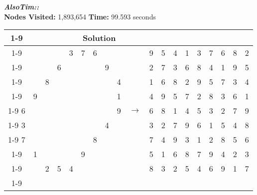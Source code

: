 \documentclass{article}
\begin{document}
\small\emph{\textbf{AlsoTim::}}\\ \textbf{Nodes Visited:} 1,893,654 \textbf{Time:} 99.593 seconds\\
\begin{tabular}{||c|c|c||c|c|c||c|c|c|| c ||c|c|c||c|c|c||c|c|c||}
  \cmidrule{1-9} \cmidrule{11-19}
  \multicolumn{9}{|c|}{Problem} &                   & \multicolumn{9}{|c|}{Solution}   \\\cmidrule{1-9} \cmidrule{11-19} \morecmidrules \cmidrule{1-9} \cmidrule{11-19}
  &   &   &   & 3 & 7 & 6 &   &   &  & 9 & 5 & 4 & 1 & 3 & 7 & 6 & 8 & 2\\\cmidrule{1-9} \cmidrule{11-19}
  &   &   & 6 &   &   &   & 9 &   &  & 2 & 7 & 3 & 6 & 8 & 4 & 1 & 9 & 5\\\cmidrule{1-9} \cmidrule{11-19}
  &   & 8 &   &   &   &   &   & 4 &  & 1 & 6 & 8 & 2 & 9 & 5 & 7 & 3 & 4\\\cmidrule{1-9} \cmidrule{11-19} \morecmidrules \cmidrule{1-9} \cmidrule{11-19}
  & 9 &   &   &   &   &   &   & 1 &  & 4 & 9 & 5 & 7 & 2 & 8 & 3 & 6 & 1\\\cmidrule{1-9} \cmidrule{11-19}
6 &   &   &   &   &   &   &   & 9 & $\rightarrow$ & 6 & 8 & 1 & 4 & 5 & 3 & 2 & 7 & 9\\\cmidrule{1-9} \cmidrule{11-19}
3 &   &   &   &   &   &   & 4 &   &  & 3 & 2 & 7 & 9 & 6 & 1 & 5 & 4 & 8\\\cmidrule{1-9} \cmidrule{11-19} \morecmidrules \cmidrule{1-9} \cmidrule{11-19}
7 &   &   &   &   &   & 8 &   &   &  & 7 & 4 & 9 & 3 & 1 & 2 & 8 & 5 & 6\\\cmidrule{1-9} \cmidrule{11-19}
  & 1 &   &   &   & 9 &   &   &   &  & 5 & 1 & 6 & 8 & 7 & 9 & 4 & 2 & 3\\\cmidrule{1-9} \cmidrule{11-19}
  &   & 2 & 5 & 4 &   &   &   &   &  & 8 & 3 & 2 & 5 & 4 & 6 & 9 & 1 & 7\\\cmidrule{1-9} \cmidrule{11-19} \morecmidrules \cmidrule{1-9} \cmidrule{11-19}
 \end{tabular}
\newpage
\end{document}
